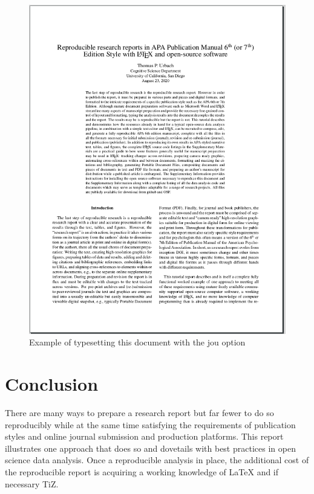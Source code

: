 \documentclass[helv,10pt,man,floatsintext]{apa6}  %
\begin{document}
\begin{figure}
\caption{Example of typesetting this document with the jou option}
\centering
\includegraphics[width=.65\textwidth]{images/apa67_jou.png}
\end{figure}


\section{Conclusion}

There are many ways to prepare a research report but far fewer to do
 so reproducibly while at the same time satisfying the requirements of
publication styles and online journal submission and production
platforms.  This report illustrates one approach that does so and
dovetails with best practices in open science data analysis. Once
a reproducible analysis in place, the additional cost of the
reproducible report is acquiring a working knowledge of \LaTeX{} and
if necessary Ti{\it}Z.

\newpage
\printbibliography
\end{document}
